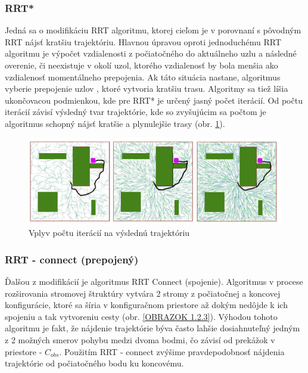 \subsubsection{RRT*}
\label{kap:1.2.2}

Jedná sa o modifikáciu RRT algoritmu, ktorej cieľom je v porovnaní s pôvodným RRT nájsť kratšiu trajektóriu. Hlavnou úpravou oproti jednoduchému RRT algoritmu je výpočet vzdialenosti z počiatočného do aktuálneho uzlu a následné overenie, či neexistuje v okolí uzol, ktorého vzdialenosť by bola menšia ako vzdialenosť momentálneho prepojenia. Ak táto situácia nastane, algoritmus vyberie prepojenie uzlov , ktoré vytvoria kratšiu trasu. Algoritmy sa tiež líšia ukončovacou podmienkou, kde pre RRT* je určený jasný počet iterácií. Od počtu iterácií závisí výsledný tvar trajektórie, kde so zvyšujúcim sa počtom je algoritmus schopný nájsť kratšie a plynulejšie trasy (obr. \ref{OBRAZOK 1.2.2}).

\begin{figure}[h]
	\centering
	\includegraphics[width=160mm]{img/RRT2.png}
	\caption{Vplyv počtu iterácií na výslednú trajektóriu \cite{}}\label{OBRAZOK 1.2.2} 
\end{figure} 

\subsubsection{RRT - connect (prepojený)}
\label{kap:1.2.3}
Ďalšou z modifikácií je algoritmus RRT Connect (spojenie). Algoritmus v procese rozširovania stromovej štruktúry vytvára 2 stromy z počiatočnej a koncovej konfigurácie, ktoré sa šíria v konfiguračnom priestore až dokým nedôjde k ich spojeniu a tak vytvoreniu cesty (obr. \ref{OBRAZOK 1.2.3}). Výhodou tohoto algoritmu je fakt, že nájdenie trajektórie býva často lahšie dosiahnuteľný jedným z 2 možných smerov pohybu medzi dvoma bodmi, čo závisí od prekážok v priestore - $C_{obs}$. Použitím RRT - connect zvýšime pravdepodobnosť nájdenia trajektórie od počiatočného bodu ku koncovému.  

